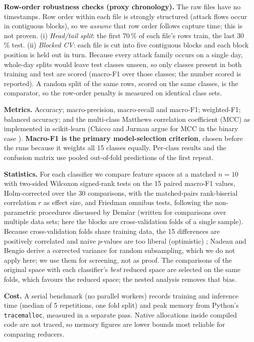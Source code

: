 \documentclass[conference,a4paper]{IEEEtran}
\begin{document}
\textbf{Row-order robustness checks (proxy chronology).} The raw files have no timestamps. Row order within each file is strongly structured (attack flows occur in contiguous blocks), so we \emph{assume} that row order follows capture time; this is not proven. (i) \emph{Head/tail split}: the first 70\,\% of each file's rows train, the last 30\,\% test. (ii) \emph{Blocked CV}: each file is cut into five contiguous blocks and each block position is held out in turn. Because every attack family occurs on a single day, whole-day splits would leave test classes unseen, so only classes present in both training and test are scored (macro-F1 over those classes; the number scored is reported). A random split of the same rows, scored on the same classes, is the comparator, so the row-order penalty is measured on identical class sets.

\textbf{Metrics.} Accuracy; macro-precision, macro-recall and macro-F1; weighted-F1; balanced accuracy; and the multi-class Matthews correlation coefficient (MCC) as implemented in scikit-learn (Chicco and Jurman argue for MCC in the binary case \cite{chicco2020}). \textbf{Macro-F1 is the primary model-selection criterion}, chosen before the runs because it weights all 15 classes equally. Per-class results and the confusion matrix use pooled out-of-fold predictions of the first repeat.

\textbf{Statistics.} For each classifier we compare feature spaces at a matched $n=10$ with two-sided Wilcoxon signed-rank tests on the 15 paired macro-F1 values, Holm-corrected over the 30 comparisons, with the matched-pairs rank-biserial correlation $r$ as effect size, and Friedman omnibus tests, following the non-parametric procedures discussed by Dem\v{s}ar \cite{demsar2006} (written for comparisons over multiple data sets; here the blocks are cross-validation folds of a single sample). Because cross-validation folds share training data, the 15 differences are positively correlated and naive $p$-values are too liberal (optimistic) \cite{nadeau2003}; Nadeau and Bengio derive a corrected variance for random subsampling, which we do not apply here; we use them for screening, not as proof. The comparisons of the original space with each classifier's \emph{best} reduced space are selected on the same folds, which favours the reduced space; the nested analysis removes that bias.

\textbf{Cost.} A serial benchmark (no parallel workers) records training and inference time (median of 5 repetitions, one fold split) and peak memory from Python's \texttt{tracemalloc}, measured in a separate pass. Native allocations inside compiled code are not traced, so memory figures are lower bounds most reliable for comparing reducers.
\end{document}
